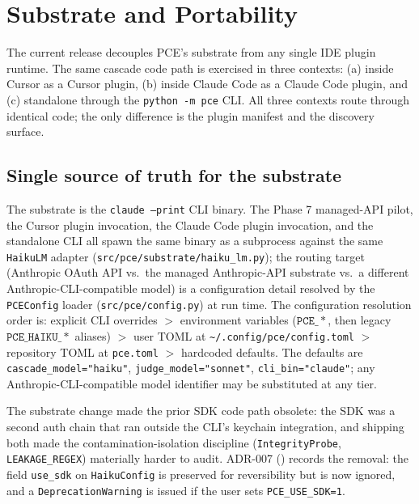 \section{Substrate and Portability}\label{sec:substrate}

\sloppy

The current release decouples PCE's substrate from any single IDE plugin runtime. The same cascade code path is exercised in three contexts: (a) inside Cursor as a Cursor plugin, (b) inside Claude Code as a Claude Code plugin, and (c) standalone through the \texttt{python -m pce} CLI. All three contexts route through identical code; the only difference is the plugin manifest and the discovery surface.

\subsection{Single source of truth for the substrate}

The substrate is the \texttt{claude --print} CLI binary. The Phase 7 managed-API pilot, the Cursor plugin invocation, the Claude Code plugin invocation, and the standalone CLI all spawn the same binary as a subprocess against the same \texttt{HaikuLM} adapter (\texttt{src/pce/substrate/haiku\_lm.py}); the routing target (Anthropic OAuth API vs.\ the managed Anthropic-API substrate vs.\ a different Anthropic-CLI-compatible model) is a configuration detail resolved by the \texttt{PCEConfig} loader (\texttt{src/pce/config.py}) at run time. The configuration resolution order is: explicit CLI overrides $>$ environment variables ($\mathtt{PCE\_*}$, then legacy $\mathtt{PCE\_HAIKU\_*}$ aliases) $>$ user TOML at \texttt{\textasciitilde/.config/pce/config.toml} $>$ repository TOML at \texttt{pce.toml} $>$ hardcoded defaults. The defaults are \texttt{cascade\_model="haiku"}, \texttt{judge\_model="sonnet"}, \texttt{cli\_bin="claude"}; any Anthropic-CLI-compatible model identifier may be substituted at any tier.

The substrate change made the prior SDK code path obsolete: the SDK was a second auth chain that ran outside the CLI's keychain integration, and shipping both made the contamination-isolation discipline (\texttt{IntegrityProbe}, \texttt{LEAKAGE\_REGEX}) materially harder to audit. ADR-007 () records the removal: the field \texttt{use\_sdk} on \texttt{HaikuConfig} is preserved for reversibility but is now ignored, and a \texttt{DeprecationWarning} is issued if the user sets \texttt{PCE\_USE\_SDK=1}.

